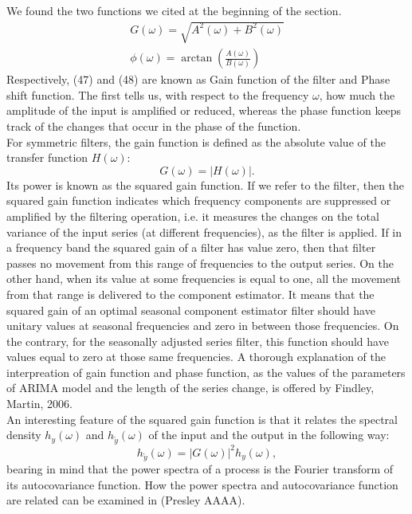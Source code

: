 \documentclass{article}
\begin{document}
We found the two functions we cited at the beginning of the section.
\begin{gather}
G(\omega)=\sqrt{A^2(\omega)+B^2(\omega)} \\
\phi(\omega)=\arctan(\frac{A(\omega)}{B(\omega)})
\end{gather}
Respectively, (47) and (48) are known as Gain function of the filter and Phase shift function. The first tells us, with respect to the frequency $\omega$, how much the amplitude of the input is amplified or reduced, whereas the phase function keeps track of the changes that occur in the phase of the function.\\For symmetric filters, the gain function is defined as the absolute value of the transfer function $H(\omega)$:
\begin{equation}
G(\omega)=|H(\omega)|.
\end{equation}
Its power is known as the squared gain function. If we refer to the filter, then the squared gain function indicates which frequency components are suppressed or amplified by the filtering operation, i.e. it measures the changes on the total variance of the input series (at different frequencies), as the filter is applied. If in a frequency band the squared gain of a filter has value zero, then that filter passes no movement from this range of frequencies to the output series. On the other hand, when its value at some frequencies is equal to one, all the movement from that range is delivered to the component estimator. It means that the squared gain of an optimal seasonal component estimator filter should have unitary values at seasonal frequencies and zero in between those frequencies. On the contrary, for the seasonally adjusted series filter, this function should have values equal to zero at those same frequencies. A thorough explanation of the interpreation of gain function and phase function, as the values of the parameters of ARIMA model and the length of the series change, is offered by Findley, Martin, 2006.\\An interesting feature of the squared gain function is that it relates the spectral density $h_y(\omega)$ and $h_{\tilde{y}}(\omega)$ of the input and the output in the following way:
\begin{equation}
h_{\tilde{y}}(\omega)=|G(\omega)|^2h_y(\omega),
\end{equation}
bearing in mind that the power spectra of a process is the Fourier transform of its autocovariance function. How the power spectra and autocovariance function are related can be examined in (Presley AAAA).
\end{document}

